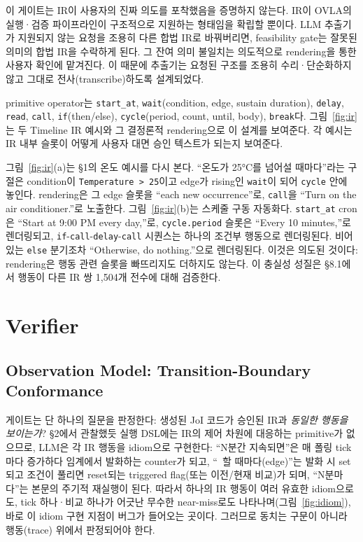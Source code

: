 \documentclass[sigconf,nonacm,anonymous,review]{acmart}
\begin{document}
이 게이트는 IR이 사용자의 진짜 의도를 포착했음을 증명하지 않는다. IR이 OVLA의 실행·검증 파이프라인이 구조적으로 지원하는 형태임을 확립할 뿐이다. LLM 추출기가 지원되지 않는 요청을 조용히 다른 합법 IR로 바꿔버리면, feasibility gate는 잘못된 의미의 합법 IR을 수락하게 된다. 그 잔여 의미 불일치는 의도적으로 rendering을 통한 사용자 확인에 맡겨진다. 이 때문에 추출기는 요청된 구조를 조용히 수리·단순화하지 않고 그대로 전사(transcribe)하도록 설계되었다.

primitive operator는 \texttt{start\_at}, \texttt{wait}(condition, edge, sustain duration), \texttt{delay}, \texttt{read}, \texttt{call}, \texttt{if}(then/else), \texttt{cycle}(period, count, until, body), \texttt{break}다. 그림~\ref{fig:ir}는 두 Timeline IR 예시와 그 결정론적 rendering으로 이 설계를 보여준다. 각 예시는 IR 내부 슬롯이 어떻게 사용자 대면 승인 텍스트가 되는지 보여준다.

그림~\ref{fig:ir}(a)는 \S1의 온도 예시를 다시 본다. ``온도가 25°C를 넘어설 때마다''라는 구절은 condition이 \texttt{Temperature > 25}이고 edge가 rising인 \texttt{wait}이 되어 \texttt{cycle} 안에 놓인다. rendering은 그 edge 슬롯을 ``each new occurrence''로, \texttt{call}을 ``Turn on the air conditioner.''로 노출한다. 그림~\ref{fig:ir}(b)는 스케줄 구동 자동화다. \texttt{start\_at} cron은 ``Start at 9:00 PM every day,''로, \texttt{cycle.period} 슬롯은 ``Every 10 minutes,''로 렌더링되고, \texttt{if}-\texttt{call}-\texttt{delay}-\texttt{call} 시퀀스는 하나의 조건부 행동으로 렌더링된다. 비어 있는 \texttt{else} 분기조차 ``Otherwise, do nothing.''으로 렌더링된다. 이것은 의도된 것이다: rendering은 행동 관련 슬롯을 빠뜨리지도 더하지도 않는다. 이 충실성 성질은 \S8.1에서 행동이 다른 IR 쌍 1,504개 전수에 대해 검증한다.

\section{Verifier}

\subsection{Observation Model: Transition-Boundary Conformance}

게이트는 단 하나의 질문을 판정한다: 생성된 JoI 코드가 승인된 IR과 \emph{동일한 행동을 보이는가}? \S2에서 관찰했듯 실행 DSL에는 IR의 제어 차원에 대응하는 primitive가 없으므로, LLM은 각 IR 행동을 idiom으로 구현한다: ``N분간 지속되면''은 매 폴링 tick마다 증가하다 임계에서 발화하는 counter가 되고, ``~할 때마다(edge)''는 발화 시 set되고 조건이 풀리면 reset되는 triggered flag(또는 이전/현재 비교)가 되며, ``N분마다''는 본문의 주기적 재실행이 된다. 따라서 하나의 IR 행동이 여러 유효한 idiom으로도, tick 하나·비교 하나가 어긋난 무수한 near-miss로도 나타나며(그림~\ref{fig:idiom}), 바로 이 idiom 구현 지점이 버그가 들어오는 곳이다. 그러므로 동치는 구문이 아니라 행동(trace) 위에서 판정되어야 한다.
\end{document}

